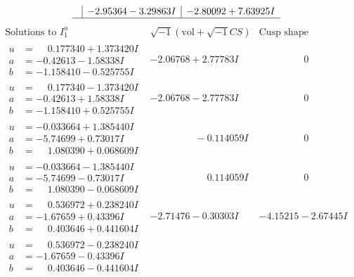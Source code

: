 \documentclass[1p]{elsarticle_modified}
\theoremstyle{definition}
\newcommand{\I}{\sqrt{-1}}
\begin{document}
$$\begin{array}{c|c|c}
 & -2.95364 - 3.29863 I & -2.80092 + 7.63925 I\\
 \hline 
 \end{array}$$\newpage$$\begin{array}{c|c|c}  
\text{Solutions to }I^u_{1}& \I (\text{vol} + \sqrt{-1}CS) & \text{Cusp shape}\\
 \hline 
\begin{aligned}
u &= \phantom{-}0.177340 + 1.373420 I \\
a &= -0.42613 - 1.58338 I \\
b &= -1.158410 - 0.525755 I\end{aligned}
 & -2.06768 + 2.77783 I & \phantom{-0.000000 } 0 \\ \hline\begin{aligned}
u &= \phantom{-}0.177340 - 1.373420 I \\
a &= -0.42613 + 1.58338 I \\
b &= -1.158410 + 0.525755 I\end{aligned}
 & -2.06768 - 2.77783 I & \phantom{-0.000000 } 0 \\ \hline\begin{aligned}
u &= -0.033664 + 1.385440 I \\
a &= -5.74699 + 0.73017 I \\
b &= \phantom{-}1.080390 + 0.068609 I\end{aligned}
 & \phantom{-0.000000 } -0.114059 I & \phantom{-0.000000 } 0 \\ \hline\begin{aligned}
u &= -0.033664 - 1.385440 I \\
a &= -5.74699 - 0.73017 I \\
b &= \phantom{-}1.080390 - 0.068609 I\end{aligned}
 & \phantom{-0.000000 -}0.114059 I & \phantom{-0.000000 } 0 \\ \hline\begin{aligned}
u &= \phantom{-}0.536972 + 0.238240 I \\
a &= -1.67659 + 0.43396 I \\
b &= \phantom{-}0.403646 + 0.441604 I\end{aligned}
 & -2.71476 - 0.30303 I & -4.15215 - 2.67445 I \\ \hline\begin{aligned}
u &= \phantom{-}0.536972 - 0.238240 I \\
a &= -1.67659 - 0.43396 I \\
b &= \phantom{-}0.403646 - 0.441604 I\end{aligned}

\end{array}$$
\end{document}
